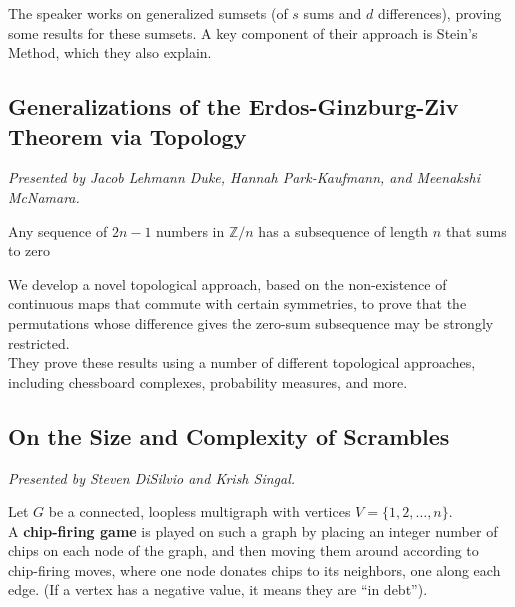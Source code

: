 \documentclass[12pt]{amsart}
\begin{document}
\begin{result*}
    The speaker works on generalized sumsets (of $s$ sums and $d$ differences), proving some results for these sumsets. A key component of their approach is Stein's Method, which they also explain.
\end{result*}

\vspace{2cm}

\subsection{Generalizations of the Erdos-Ginzburg-Ziv Theorem via Topology}

\textit{}

\vspace{0.25cm}
\textit{Presented by Jacob Lehmann Duke, Hannah Park-Kaufmann, and Meenakshi McNamara.}

\begin{theorem*}
Any sequence of $2n - 1$ numbers in $\mathbb{Z}/n$ has a subsequence of length $n$ that sums to zero
\end{theorem*}

\begin{result*}
    We develop a novel topological approach, based on the non-existence of continuous maps that commute with certain
    symmetries, to prove that the permutations whose difference gives the zero-sum subsequence
    may be strongly restricted. \\

    They prove these results using a number of different topological approaches, including chessboard complexes, probability measures, and more.
\end{result*}

\newpage

\subsection{On the Size and Complexity of Scrambles}

\textit{}

\vspace{0.25cm}
\textit{Presented by Steven DiSilvio and Krish Singal.}

\begin{definition}
Let $G$ be a connected, loopless multigraph with vertices $V = \{1, 2, \dots, n\}.$ \\

A \textbf{chip-firing game} is played on such a graph by placing an integer number of chips on each node of the graph, and then moving them around according to chip-firing moves, where one node donates chips to its neighbors, one along each edge. 
(If a vertex has a negative value, it means they are ``in debt'').\end{definition}
\end{document}
